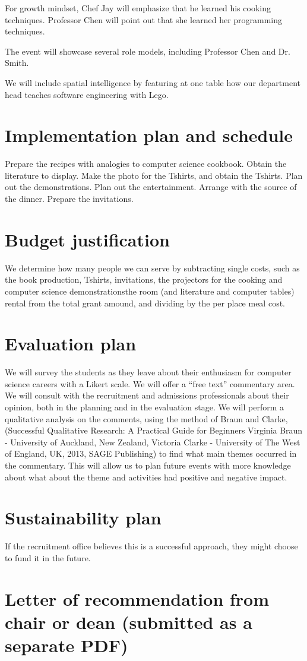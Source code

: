 \documentclass[]{article}
\begin{document}
For growth mindset, Chef Jay will emphasize that he learned his cooking techniques. Professor Chen will point out that she learned 
her programming techniques.

The event will showcase several role models, including Professor Chen and Dr. Smith.

We will include spatial intelligence by featuring at one table how our department head teaches software engineering with 
Lego.%


\section{Implementation plan and schedule}
Prepare the recipes with analogies to computer science cookbook.
Obtain the literature to display.
Make the photo for the Tshirts, and obtain the Tshirts.
Plan out the demonstrations.
Plan out the entertainment.
Arrange with the source of the dinner.
Prepare the invitations.

\section{Budget justification}
We determine how many people we can serve by subtracting single costs, such as the book production, Tshirts, invitations, the
 projectors for the cooking and computer science demonstrationsthe room (and literature and computer tables) rental from the 
 total grant amound, and dividing by the per place meal cost.

\section{Evaluation plan}
We will survey the students as they leave about their enthusiasm for computer science careers with a Likert scale.
We will offer a ``free text'' commentary area.
We will consult with the recruitment and admissions professionals about their opinion, both in the planning and in the evaluation stage.
We will perform a qualitative analysis on the comments, using the method of Braun and Clarke,(Successful Qualitative Research: 
A Practical Guide for Beginners
Virginia Braun - University of Auckland, New Zealand, Victoria Clarke - University of The West of England, UK, 2013, SAGE 
Publishing) to find what main themes occurred in the commentary. This will allow us to plan future events with more knowledge 
about what about the theme and activities had positive and negative impact.%

\section{Sustainability plan}
If the recruitment office believes this is a successful approach, they might choose to fund it in the future.

\section{Letter of recommendation from chair or dean (submitted as a separate PDF)}
\end{document}
